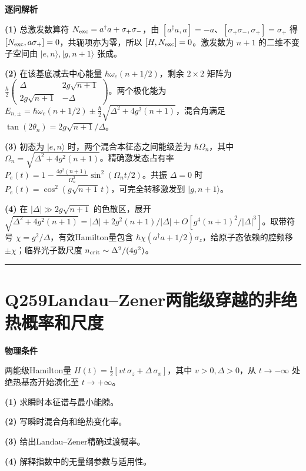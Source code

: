 \documentclass[UTF8,a4paper,11pt,oneside,openany]{ctexbook}
\begin{document}
\par\medskip\noindent\textbf{逐问解析}
\par\noindent\textbf{(1)} 总激发数算符 \(N_{\rm exc}=a^\dagger a+\sigma_+\sigma_-\)，由 \([a^\dagger a,a]=-a\)、\([\sigma_+\sigma_-,\sigma_+]=\sigma_+\) 得 \([N_{\rm exc},a\sigma_+]=0\)，共轭项亦为零，所以 \([H,N_{\rm exc}]=0\)。激发数为 \(n+1\) 的二维不变子空间由 \(|e,n\rangle,|g,n+1\rangle\) 张成。
\par\noindent\textbf{(2)} 在该基底减去中心能量 \(\hbar\omega_c(n+1/2)\)，剩余 \(2\times2\) 矩阵为 \(\frac\hbar2\begin{pmatrix}\Delta&2g\sqrt{n+1}\\2g\sqrt{n+1}&-\Delta\end{pmatrix}\)。两个极化能为 \(E_{n,\pm}=\hbar\omega_c(n+1/2)\pm\frac\hbar2\sqrt{\Delta^2+4g^2(n+1)}\)，混合角满足 \(\tan(2\theta_n)=2g\sqrt{n+1}/\Delta\)。
\par\noindent\textbf{(3)} 初态为 \(|e,n\rangle\) 时，两个混合本征态之间能级差为 \(\hbar\Omega_n\)，其中 \(\Omega_n=\sqrt{\Delta^2+4g^2(n+1)}\)。精确激发态占有率 \(P_e(t)=1-\frac{4g^2(n+1)}{\Omega_n^2}\sin^2(\Omega_nt/2)\)。共振 \(\Delta=0\) 时 \(P_e(t)=\cos^2(g\sqrt{n+1}\,t)\)，可完全转移激发到 \(|g,n+1\rangle\)。
\par\noindent\textbf{(4)} 在 \(|\Delta|\gg2g\sqrt{n+1}\) 的色散区，展开 \(\sqrt{\Delta^2+4g^2(n+1)}=|\Delta|+2g^2(n+1)/|\Delta|+O[g^4(n+1)^2/|\Delta|^3]\)。取带符号 \(\chi=g^2/\Delta\)，有效Hamilton量包含 \(\hbar\chi(a^\dagger a+1/2)\sigma_z\)，给原子态依赖的腔频移 \(\pm\chi\)；临界光子数尺度 \(n_{\rm crit}\sim\Delta^2/(4g^2)\)。

\par\bigskip\hrule\bigskip
\section*{Q259\quad Landau–Zener两能级穿越的非绝热概率和尺度}
\textbf{物理条件}\par 两能级Hamilton量 \(H(t)=\tfrac12[vt\,\sigma_z+\Delta\,\sigma_x]\)，其中 \(v>0,\Delta>0\)，从 \(t\to-\infty\) 处绝热基态开始演化至 \(t\to+\infty\)。
\par\noindent\textbf{(1)} 求瞬时本征谱与最小能隙。
\par\noindent\textbf{(2)} 写瞬时混合角和绝热变化率。
\par\noindent\textbf{(3)} 给出Landau–Zener精确过渡概率。
\par\noindent\textbf{(4)} 解释指数中的无量纲参数与适用性。
\end{document}
